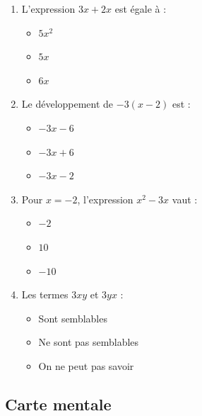 \begin{quizbox}
	\begin{enumerate}
		\item L'expression $3x + 2x$ est égale à :
		\begin{itemize}
			\item[$\square$] $5x^2$
			\item[$\square$] $5x$
			\item[$\square$] $6x$
		\end{itemize}
		
		\item Le développement de $-3(x - 2)$ est :
		\begin{itemize}
			\item[$\square$] $-3x - 6$
			\item[$\square$] $-3x + 6$
			\item[$\square$] $-3x - 2$
		\end{itemize}
		
		\item Pour $x = -2$, l'expression $x^2 - 3x$ vaut :
		\begin{itemize}
			\item[$\square$] $-2$
			\item[$\square$] $10$
			\item[$\square$] $-10$
		\end{itemize}
		
		\item Les termes $3xy$ et $3yx$ :
		\begin{itemize}
			\item[$\square$] Sont semblables
			\item[$\square$] Ne sont pas semblables
			\item[$\square$] On ne peut pas savoir
		\end{itemize}
	\end{enumerate}
\end{quizbox}

\subsection{Carte mentale}

